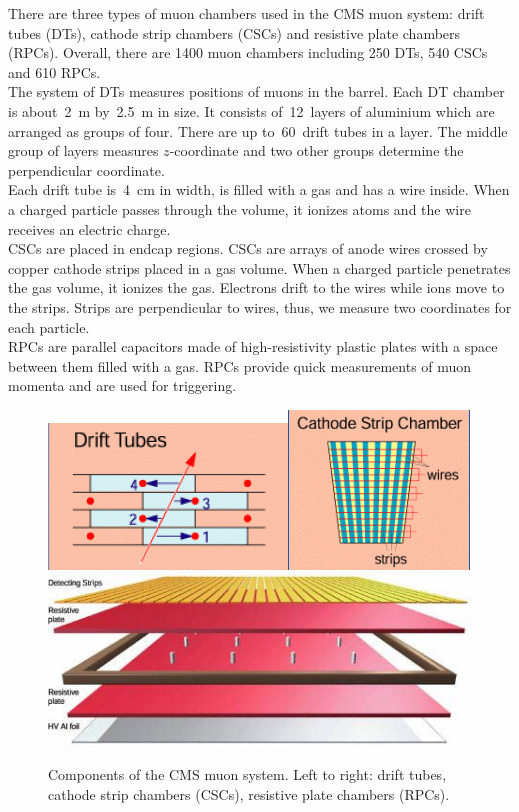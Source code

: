 There are three types of muon chambers used in the CMS muon system: drift tubes (DTs), cathode strip chambers (CSCs) and resistive plate chambers (RPCs). Overall, there are 1400 muon chambers including 250 DTs, 540 CSCs and 610 RPCs.\\

The system of DTs measures positions of muons in the barrel. Each DT chamber is about~2~m by~2.5~m in size. It consists of~12~layers of aluminium which are arranged as groups of four. There are up to~60~drift tubes in a layer. The middle group of layers measures $z$-coordinate and two other groups determine the perpendicular coordinate.\\

Each drift tube is~4~cm in width, is filled with a gas and has a wire inside. When a charged particle passes through the volume, it ionizes atoms and the wire receives an electric charge.\\

CSCs are placed in endcap regions. CSCs are arrays of anode wires crossed by copper cathode strips placed in a gas volume. When a charged particle penetrates the gas volume, it ionizes the gas. Electrons drift to the wires while ions move to the strips. Strips are perpendicular to wires, thus, we measure two coordinates for each particle. \\ 

RPCs are parallel capacitors made of high-resistivity plastic plates with a space between them filled with a gas. RPCs provide quick measurements of muon momenta and are used for triggering. \\ 

\begin{figure}[htb]
  \begin{center}
    \includegraphics[height=2.5 cm]{../figs/Exp/muonSystem_driftTubes.png}\quad\includegraphics[height=2.5 cm]{../figs/Exp/muonSystem_CSC.png}\quad\includegraphics[height=2.5 cm]{../figs/Exp/muonSystem_RPC.png}
    \caption{Components of the CMS muon system. Left to right: drift tubes, cathode strip chambers (CSCs), resistive plate chambers (RPCs).}
    \label{fig:muonSystem}
  \end{center}
\end{figure}


